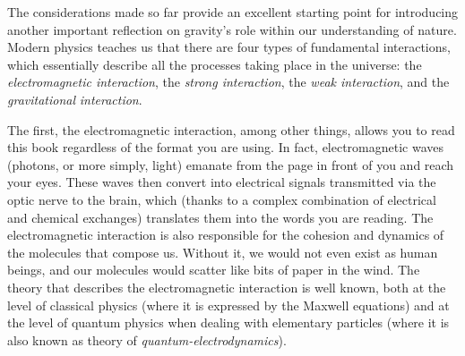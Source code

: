 The considerations made so far provide an excellent starting point for introducing
another important reflection on gravity's role within our understanding of nature.
Modern physics teaches us that there are four types of fundamental interactions, which
essentially describe all the processes taking place in the universe: the
\emph{electromagnetic interaction}, the \emph{strong
interaction}, the \emph{weak
interaction}, and the
\emph{gravitational} \emph{interaction}.

The first, the electromagnetic interaction, among other things, allows you to read this
book regardless of the format you are using. In fact, electromagnetic
waves (photons, or more simply, light)
emanate from the page in front of you and reach your eyes. These waves then convert into
electrical signals transmitted via the optic nerve to the brain, which (thanks to a
complex combination of electrical and chemical exchanges) translates them into the words
you are reading. The electromagnetic interaction is also responsible for the cohesion
and dynamics of the molecules that compose us. Without it, we would not even exist as
human beings, and our molecules would scatter like bits of paper in the wind. The theory
that describes the electromagnetic interaction is well known, both at the level of
classical physics (where it is expressed by the Maxwell equations) and at the level of
quantum physics when dealing with elementary particles (where it is also known as theory
of \emph{quantum-electrodynamics}).

